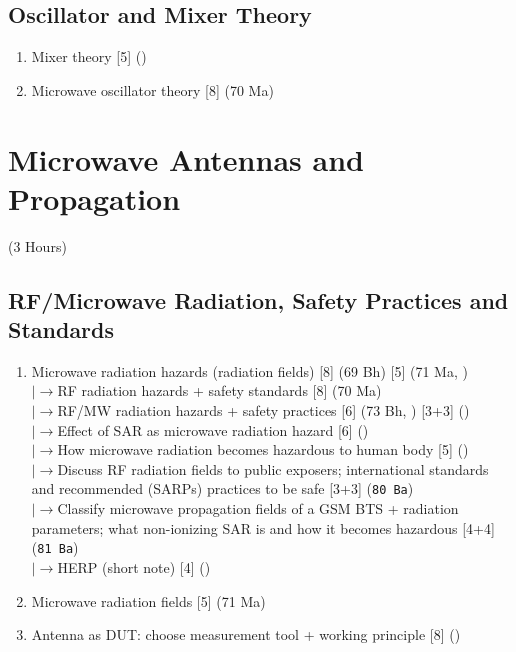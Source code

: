 \documentclass[12pt]{article}
\newcommand{\lb}{\\$\left|\rightarrow\right.$}
\begin{document}
  \subsection{Oscillator and Mixer Theory}
    \begin{enumerate}[topsep=0pt, noitemsep]
      \item Mixer theory \hfill [5] ()
      \item Microwave oscillator theory \hfill [8] (70 Ma)
    \end{enumerate}

\pagebreak
\section{Microwave Antennas and Propagation}
\begin{center}(3 Hours)\end{center}

  \subsection{RF/Microwave Radiation, Safety Practices and Standards}
    \begin{enumerate}[topsep=0pt, noitemsep]
      \item Microwave radiation hazards (radiation fields) \hfill [8] (69 Bh) [5] (71 Ma, )
        \lb RF radiation hazards + safety standards \hfill [8] (70 Ma)
        \lb RF/MW radiation hazards + safety practices \hfill [6] (73 Bh, ) [3+3] ()
        \lb Effect of SAR as microwave radiation hazard \hfill [6] ()
        \lb How microwave radiation becomes hazardous to human body \hfill [5] ()
        \lb Discuss RF radiation fields to public exposers; international standards and recommended (SARPs) practices to be safe \hfill [3+3] (\texttt{80 Ba})
        \lb Classify microwave propagation fields of a GSM BTS + radiation parameters; what non-ionizing SAR is and how it becomes hazardous \hfill [4+4] (\texttt{81 Ba})
        \lb HERP (short note) \hfill [4] ()
      \item Microwave radiation fields \hfill [5] (71 Ma)
      \item Antenna as DUT: choose measurement tool + working principle \hfill [8] ()
    \end{enumerate}

\pagebreak
\end{document}
